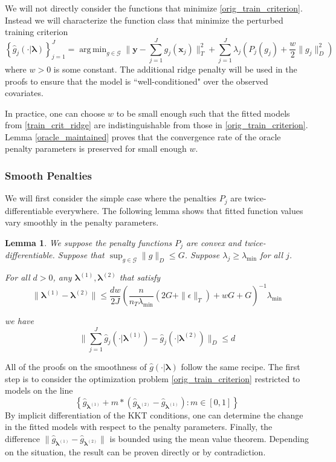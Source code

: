 \documentclass[12pt]{article}
\newtheorem{lemma}{Lemma}
\DeclareMathOperator*{\argmin}{arg\,min}
\begin{document}
We will not directly consider the functions that minimize \eqref{orig_train_criterion}. Instead we will characterize the function class that minimize the perturbed training criterion
\begin{equation}
\label{train_crit_ridge}
\left\{ \hat{g}_j(\cdot | \boldsymbol \lambda) \right \}_{j=1}^J = \argmin_{g\in \mathcal{G}} \| \boldsymbol y -  \sum_{j=1}^J g_j(\boldsymbol x_j) \|^2_T + \sum_{j=1}^J \lambda_j \left ( P_j(g_j) + \frac{w}{2} \| g_j \|^2_D \right )
\end{equation}
where $w > 0$ is some constant. The additional ridge penalty will be used in the proofs to ensure that the model is ``well-conditioned" over the observed covariates.

In practice, one can choose $w$ to be small enough such that the fitted models from \eqref{train_crit_ridge} are indistinguishable from those in \eqref{orig_train_criterion}. Lemma \ref{oracle_maintained} proves that the convergence rate of the oracle penalty parameters is preserved for small enough $w$.

\subsubsection{Smooth Penalties}
We will first consider the simple case where the penalties $P_j$ are twice-differentiable everywhere. The following lemma shows that fitted function values vary smoothly in the penalty parameters. 

\begin{lemma}
\label{lemma:smooth_penalty}
We suppose the penalty functions $P_{j}$ are convex and twice-differentiable.
Suppose that $\sup_{g\in\mathcal{G}}\|g\|_{D}\le G$.
Suppose $\lambda_j \ge \lambda_{\min}$ for all $j$.

For all $d>0$, any $\boldsymbol \lambda^{(1)}, \boldsymbol \lambda^{(2)}$ that satisfy 
\[
\|\boldsymbol \lambda^{(1)}- \boldsymbol \lambda^{(2)}\|\le\frac{dw}{2J}\left(\frac{n}{n_T \lambda_{\min} }\left(2G+\|\epsilon\|_{T}\right)+wG+G\right)^{-1}\lambda_{\min}
\]

we have
\[
\|\sum_{j=1}^{J}\hat{g}_{j}(\cdot| \boldsymbol \lambda^{(1)})-\hat{g}_{j}(\cdot| \boldsymbol \lambda^{(2)})\|_{D}\le d
\]
\end{lemma}

All of the proofs on the smoothness of $\hat{g}(\cdot | \boldsymbol \lambda)$ follow the same recipe. The first step is to consider the optimization problem \eqref{orig_train_criterion} restricted to models on the line
\begin{equation}
\left \{ \hat{g}_{\boldsymbol \lambda^{(1)}} + m * \left (\hat{g}_{\boldsymbol \lambda^{(2)}} - \hat{g}_{\boldsymbol \lambda^{(1)}} \right ) : m \in [0,1] \right \}
\end{equation}
By implicit differentiation of the KKT conditions, one can determine the change in the fitted models with respect to the penalty parameters. Finally, the difference $\| \hat{g}_{\boldsymbol \lambda^{(1)}} -  \hat{g}_{\boldsymbol \lambda^{(2)}} \|$ is bounded using the mean value theorem. Depending on the situation, the result can be proven directly or by contradiction.
\end{document}
